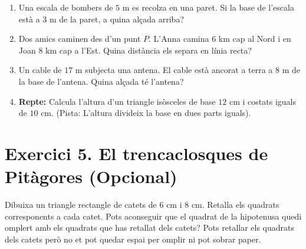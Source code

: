 \documentclass[12pt,a4paper]{article}
\begin{document}
\begin{enumerate}
    \item Una escala de bombers de $5$ m es recolza en una paret. Si la base de l'escala està a $3$ m de la paret, a quina alçada arriba?
    
    \vspace{0.5cm}

    \item Dos amics caminen des d'un punt $P$. L'Anna camina $6$ km cap al Nord i en Joan $8$ km cap a l'Est. Quina distància els separa en línia recta?
    \vspace{3cm}

    \item Un cable de $17$ m subjecta una antena. El cable està ancorat a terra a $8$ m de la base de l'antena. Quina alçada té l'antena?
    \vspace{2.5cm}

    \item \textbf{Repte:} Calcula l'altura d'un triangle isòsceles de base $12$ cm i costats iguals de $10$ cm. (Pista: L'altura divideix la base en dues parts iguals).
    \vspace{2.5cm}
\end{enumerate}

\section*{Exercici 5. El trencaclosques de Pitàgores (Opcional)}

Dibuixa un triangle rectangle de catets de $6\text{ cm}$ i $8\text{ cm}$. Retalla els quadrats corresponents a cada catet. Pots aconseguir que el quadrat de la hipotenusa quedi omplert amb els quadrats que has retallat dels catets? Pots retallar els quadrats dels catets però no et pot quedar espai per omplir ni pot sobrar paper.
\end{document}
